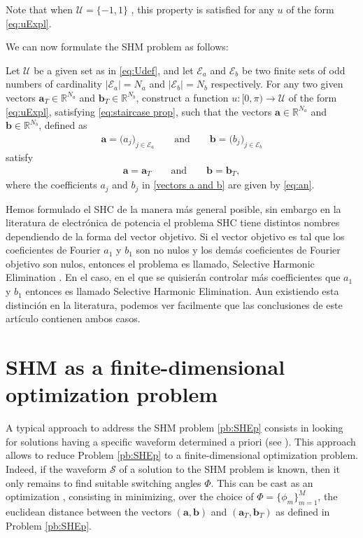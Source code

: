 \documentclass[twocolumn]{autart}    %
\begin{document}
Note that when $\mathcal{U} = \{-1,1\}$ , this property is satisfied for any $u$ of the form \eqref{eq:uExpl}.

We can now formulate the SHM problem as follows:
\newline
\begin{problem}[SHM]\label{pb:SHEp}
Let $\mathcal{U}$ be a given set as in \eqref{eq:Udef}, and let $\mathcal{E} _a $ and $\mathcal{E} _b $ be two finite sets of odd numbers of cardinality $|\mathcal{E}_a| = N_a $ and $ |\mathcal{E} _b| = N_b$ respectively. For any two given vectors $\bm{a}_T \in \mathbb{R}^{N_a}$ and $\bm{b}_T \in \mathbb{R}^{N_b} $, construct a function $u: [0,\pi)\to\mathcal{U}$ of the form \eqref{eq:uExpl}, satisfying \eqref{eq:staircase prop}, such that the vectors $\bm{a} \in \mathbb{R}^{N_a}$ and $\bm{b} \in \mathbb{R}^{N_b}$, defined as
\begin{align}\label{vectors a and b}
	\bm{a} = \big( a_j \big)_{j\in \mathcal{E}_a} \qquad \text{and} \qquad
	\bm{b} = \big( b_j \big)_{j\in \mathcal{E}_b}
\end{align}
satisfy
\begin{align*} 
	\bm{a} = \bm{a}_T \qquad \text{and} \qquad \bm{b} = \bm{b}_T,
\end{align*}
where the coefficients $a_j$ and $b_j$ in \eqref{vectors a and b} are given by \eqref{eq:an}.
\end{problem}  

Hemos formulado el SHC de la manera más general posible, sin embargo en la literatura de electrónica de potencia el problema SHC tiene distintos nombres dependiendo de la forma del vector objetivo. Si el vector objetivo es tal que los coeficientes de Fourier $a_1$ y $b_1$ son no nulos y los demás coeficientes de Fourier objetivo son nulos, entonces el problema es llamado, Selective Harmonic Elimination \cite{Janabi2020}. En el caso, en el que se quisierán controlar más coefficientes que $a_1$ y $b_1$ entonces es llamado Selective Harmonic Elimination. Aun existiendo esta distinción en la literatura, podemos ver facilmente que las conclusiones de este artículo contienen ambos casos. 

\section{SHM as a finite-dimensional optimization problem}\label{sec:SHE_finite-dim_pbm}

A typical approach to address the SHM problem \eqref{pb:SHEp} consists in looking for solutions having a specific waveform determined a priori (see \cite{Yang2015,Konstantinou2010,Sun1996}). This approach allows to reduce Problem \ref{pb:SHEp} to a finite-dimensional optimization problem.
Indeed, if the waveform $\mathcal S$ of a solution to the SHM problem is known,  then it only remains to find suitable switching angles $\Phi$. This can be cast as an optimization , consisting in minimizing, over the choice of $\Phi = \{\phi_m\}_{m=1}^{M}$, the euclidean distance between the  vectors $(\bm{a}, \bm{b})$ and $(\bm{a}_T,\bm{b}_T)$ as defined in Problem \ref{pb:SHEp}.
\end{document}
